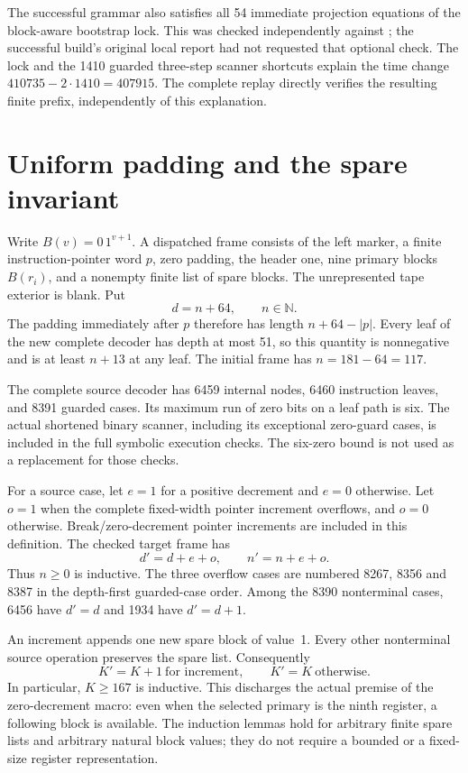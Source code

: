 \documentclass[11pt]{article}
\begin{document}
The successful grammar also satisfies all 54 immediate projection equations
of the block-aware bootstrap lock. This was checked independently against
; the successful build's original local report
had not requested that optional check. The lock and the 1410 guarded
three-step scanner shortcuts explain the time change
$410735-2\cdot1410=407915$. The complete replay directly verifies the
resulting finite prefix, independently of this explanation.

\section{Uniform padding and the spare invariant}

Write $B(v)=0\,1^{v+1}$. A dispatched frame consists of the left marker,
a finite instruction-pointer word $p$, zero padding, the header one, nine
primary blocks $B(r_i)$, and a nonempty finite list of spare blocks. The
unrepresented tape exterior is blank. Put
\[
 d=n+64,\qquad n\in\mathbb N.
\]
The padding immediately after $p$ therefore has length $n+64-|p|$.
Every leaf of the new complete decoder has depth at most 51, so this
quantity is nonnegative and is at least $n+13$ at any leaf. The initial
frame has $n=181-64=117$.

The complete source decoder has 6459 internal nodes, 6460 instruction
leaves, and 8391 guarded cases. Its maximum run of zero bits on a leaf
path is six. The actual shortened binary scanner, including its exceptional
zero-guard cases, is included in the full symbolic execution checks.
The six-zero bound is not used as a replacement for those checks.

For a source case, let $e=1$ for a positive decrement and $e=0$ otherwise.
Let $o=1$ when the complete fixed-width pointer increment overflows, and
$o=0$ otherwise. Break/zero-decrement pointer increments are included in
this definition. The checked target frame has
\[
 d'=d+e+o,\qquad n'=n+e+o.                 \tag{2}
\]
Thus $n\geq0$ is inductive. The three overflow cases are numbered 8267,
8356 and 8387 in the depth-first guarded-case order. Among the 8390
nonterminal cases, 6456 have $d'=d$ and 1934 have $d'=d+1$.

An increment appends one new spare block of value~1. Every other
nonterminal source operation preserves the spare list. Consequently
\[
 K'=K+1\ \text{for increment},\qquad K'=K\ \text{otherwise}.       \tag{3}
\]
In particular, $K\geq167$ is inductive. This discharges the actual premise
of the zero-decrement macro: even when the selected primary is the ninth
register, a following block is available. The induction lemmas hold for
arbitrary finite spare lists and arbitrary natural block values; they do
not require a bounded or a fixed-size register representation.
\end{document}
